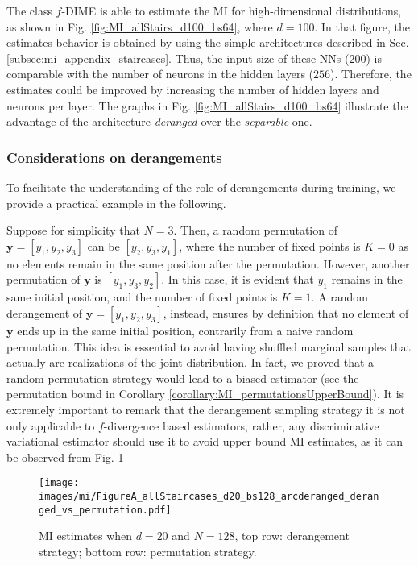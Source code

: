 The class $f$-DIME is able to estimate the MI for high-dimensional distributions, as shown in Fig. \ref{fig:MI_allStairs_d100_bs64}, where $d=100$. In that figure, the estimates behavior is obtained by using the simple architectures described in Sec. \ref{subsec:mi_appendix_staircases}. Thus, the input size of these NNs ($200$) is comparable with the number of neurons in the hidden layers ($256$).
Therefore, the estimates could be improved by increasing the number of hidden layers and neurons per layer. The graphs in Fig. \ref{fig:MI_allStairs_d100_bs64} illustrate the advantage of the architecture \textit{deranged} over the \textit{separable} one.

\subsubsection{Considerations on derangements}
\label{subsec:mi_derangement_considerations}
To facilitate the understanding of the role of derangements during training, we provide a practical example in the following.
 
Suppose for simplicity that $N=3$. Then, a random permutation of $\mathbf{y} = [y_1, y_2, y_3]$ can be $[y_2, y_3, y_1]$, where the number of fixed points is $K=0$ as no elements remain in the same position after the permutation.
However, another permutation of $\mathbf{y}$ is $[y_1, y_3, y_2]$. In this case, it is evident that $y_1$ remains in the same initial position, and the number of fixed points is $K=1$.
A random derangement of $\mathbf{y} = [y_1, y_2, y_3]$, instead, ensures by definition that no element of $\mathbf{y}$ ends up in the same initial position, contrarily from a naive random permutation. This idea is essential to avoid having shuffled marginal samples that actually are realizations of the joint distribution.
In fact, we proved that a random permutation strategy would lead to a biased estimator (see the permutation bound in Corollary \ref{corollary:MI_permutationsUpperBound}).
It is extremely important to remark that the derangement sampling strategy it is not only applicable to $f$-divergence based estimators, rather, any discriminative variational estimator should use it to avoid upper bound MI estimates, as it can be observed from Fig. \ref{fig:MI_derangementVsPermutation_beyond}
\begin{figure}
	\centering
	\texttt{[image: images/mi/FigureA\_allStaircases\_d20\_bs128\_arcderanged\_deranged\_vs\_permutation.pdf]}
	\caption{MI estimates when $d=20$ and $N=128$, top row: derangement strategy; bottom row: permutation strategy.}
	\label{fig:MI_derangementVsPermutation_beyond}
\end{figure} 
 
